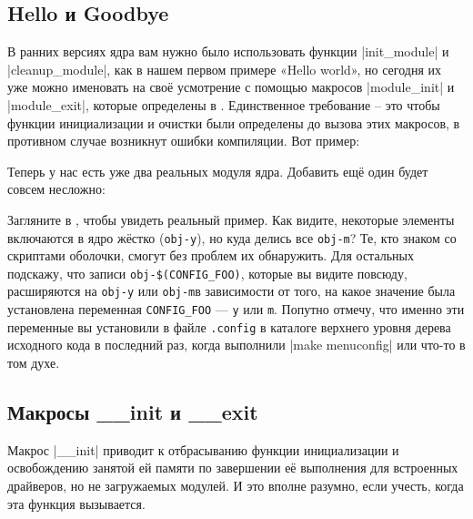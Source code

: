\documentclass[10pt, oneside]{book}
\begin{document}
\subsection{Hello и Goodbye}
\label{hello_n_goodbye}
В ранних версиях ядра вам нужно было использовать функции \cpp|init_module| и \cpp|cleanup_module|, как в нашем первом примере «Hello world», но сегодня их уже можно именовать на своё усмотрение с помощью макросов \cpp|module_init| и \cpp|module_exit|, которые определены в .
Единственное требование – это чтобы функции инициализации и очистки были определены до вызова этих макросов, в противном случае возникнут ошибки компиляции. Вот пример:


Теперь у нас есть уже два реальных модуля ядра. Добавить ещё один будет совсем несложно:


Загляните в , чтобы увидеть реальный пример. Как видите, некоторые элементы включаются в ядро жёстко (\verb|obj-y|), но куда делись все \verb|obj-m|?
Те, кто знаком со скриптами оболочки, смогут без проблем их обнаружить.
Для остальных подскажу, что записи \verb|obj-$(CONFIG_FOO)|, которые вы видите повсюду, расширяются на \verb|obj-y| или \verb|obj-m|в зависимости от того, на какое значение была установлена переменная \verb|CONFIG_FOO| — \verb|y| или \verb|m|.
Попутно отмечу, что именно эти переменные вы установили в файле \verb|.config| в каталоге верхнего уровня дерева исходного кода в последний раз, когда выполнили \sh|make menuconfig| или что-то в том духе.

\subsection{Макросы \_\_init и \_\_exit}
\label{init_n_exit}
Макрос \cpp|__init| приводит к отбрасыванию функции инициализации и освобождению занятой ей памяти по завершении её выполнения для встроенных драйверов, но не загружаемых модулей. И это вполне разумно, если учесть, когда эта функция вызывается.
\end{document}
